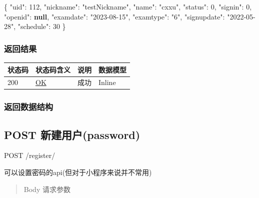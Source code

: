 \documentclass[
]{article}
\newenvironment{Shaded}{}{}
\newcommand{\DataTypeTok}[1]{\textcolor[rgb]{0.56,0.13,0.00}{#1}}
\newcommand{\DecValTok}[1]{\textcolor[rgb]{0.25,0.63,0.44}{#1}}
\newcommand{\FunctionTok}[1]{\textcolor[rgb]{0.02,0.16,0.49}{#1}}
\newcommand{\KeywordTok}[1]{\textcolor[rgb]{0.00,0.44,0.13}{\textbf{#1}}}
\newcommand{\StringTok}[1]{\textcolor[rgb]{0.25,0.44,0.63}{#1}}
\begin{document}
\begin{Shaded}
\begin{Highlighting}[]
\FunctionTok{\{}
  \DataTypeTok{"uid"}\FunctionTok{:} \DecValTok{112}\FunctionTok{,}
  \DataTypeTok{"nickname"}\FunctionTok{:} \StringTok{"testNickname"}\FunctionTok{,}
  \DataTypeTok{"name"}\FunctionTok{:} \StringTok{"cxxu"}\FunctionTok{,}
  \DataTypeTok{"status"}\FunctionTok{:} \DecValTok{0}\FunctionTok{,}
  \DataTypeTok{"signin"}\FunctionTok{:} \DecValTok{0}\FunctionTok{,}
  \DataTypeTok{"openid"}\FunctionTok{:} \KeywordTok{null}\FunctionTok{,}
  \DataTypeTok{"examdate"}\FunctionTok{:} \StringTok{"2023{-}08{-}15"}\FunctionTok{,}
  \DataTypeTok{"examtype"}\FunctionTok{:} \StringTok{"6"}\FunctionTok{,}
  \DataTypeTok{"signupdate"}\FunctionTok{:} \StringTok{"2022{-}05{-}28"}\FunctionTok{,}
  \DataTypeTok{"schedule"}\FunctionTok{:} \DecValTok{30}
\FunctionTok{\}}
\end{Highlighting}
\end{Shaded}

\hypertarget{ux8fd4ux56deux7ed3ux679c-20}{%
\subsubsection{返回结果}\label{ux8fd4ux56deux7ed3ux679c-20}}

\begin{longtable}[]{@{}llll@{}}
\toprule
状态码 & 状态码含义 & 说明 & 数据模型 \\
\midrule
\endhead
200 & \href{https://tools.ietf.org/html/rfc7231\#section-6.3.1}{OK} &
成功 & Inline \\
\bottomrule
\end{longtable}

\hypertarget{ux8fd4ux56deux6570ux636eux7ed3ux6784-16}{%
\subsubsection{返回数据结构}\label{ux8fd4ux56deux6570ux636eux7ed3ux6784-16}}

\hypertarget{post-ux65b0ux5efaux7528ux6237password}{%
\subsection{POST
新建用户(password)}\label{post-ux65b0ux5efaux7528ux6237password}}

POST /register/

可以设置密码的api(但对于小程序来说并不常用)

\begin{quote}
Body 请求参数
\end{quote}
\end{document}
